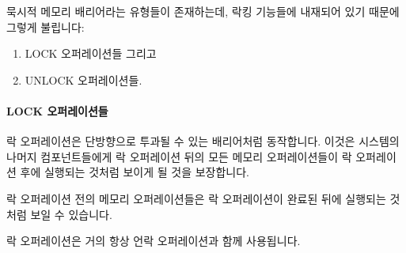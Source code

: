\begin{enumerate}
묵시적 메모리 배리어라는 유형들이 존재하는데, 락킹 기능들에 내재되어 있기
때문에 그렇게 불립니다:

\begin{enumerate}
\item	LOCK 오퍼레이션들 그리고
\item	UNLOCK 오퍼레이션들.
\end{enumerate}

\paragraph{LOCK 오퍼레이션들}

락 오퍼레이션은 단방향으로 투과될 수 있는 배리어처럼 동작합니다.
이것은 시스템의 나머지 컴포넌트들에게 락 오퍼레이션 뒤의 모든 메모리
오퍼레이션들이 락 오퍼레이션 후에 실행되는 것처럼 보이게 될 것을 보장합니다.

락 오퍼레이션 전의 메모리 오퍼레이션들은 락 오퍼레이션이 완료된 뒤에 실행되는
것처럼 보일 수 있습니다.

락 오퍼레이션은 거의 항상 언락 오퍼레이션과 함께 사용됩니다.

\end{enumerate}
